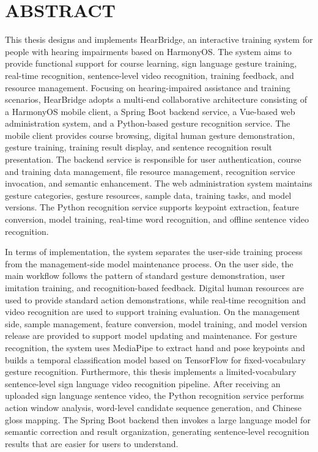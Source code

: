 ﻿%
\chapter*{ABSTRACT}

This thesis designs and implements HearBridge, an interactive training system for people with hearing impairments based on HarmonyOS. The system aims to provide functional support for course learning, sign language gesture training, real-time recognition, sentence-level video recognition, training feedback, and resource management. Focusing on hearing-impaired assistance and training scenarios, HearBridge adopts a multi-end collaborative architecture consisting of a HarmonyOS mobile client, a Spring Boot backend service, a Vue-based web administration system, and a Python-based gesture recognition service. The mobile client provides course browsing, digital human gesture demonstration, gesture training, training result display, and sentence recognition result presentation. The backend service is responsible for user authentication, course and training data management, file resource management, recognition service invocation, and semantic enhancement. The web administration system maintains gesture categories, gesture resources, sample data, training tasks, and model versions. The Python recognition service supports keypoint extraction, feature conversion, model training, real-time word recognition, and offline sentence video recognition.

In terms of implementation, the system separates the user-side training process from the management-side model maintenance process. On the user side, the main workflow follows the pattern of standard gesture demonstration, user imitation training, and recognition-based feedback. Digital human resources are used to provide standard action demonstrations, while real-time recognition and video recognition are used to support training evaluation. On the management side, sample management, feature conversion, model training, and model version release are provided to support model updating and maintenance. For gesture recognition, the system uses MediaPipe to extract hand and pose keypoints and builds a temporal classification model based on TensorFlow for fixed-vocabulary gesture recognition. Furthermore, this thesis implements a limited-vocabulary sentence-level sign language video recognition pipeline. After receiving an uploaded sign language sentence video, the Python recognition service performs action window analysis, word-level candidate sequence generation, and Chinese gloss mapping. The Spring Boot backend then invokes a large language model for semantic correction and result organization, generating sentence-level recognition results that are easier for users to understand.

